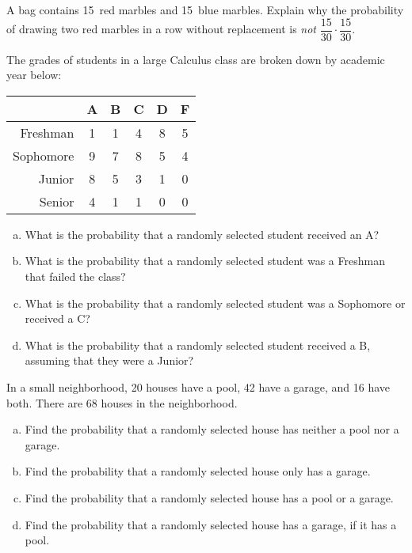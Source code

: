\documentclass[11pt,letterpaper]{article}
\begin{document}

 A bag contains 15~red marbles and 15~blue marbles. Explain why the probability of drawing two red marbles in a row without replacement is \textit{not} $\dfrac{15}{30} \cdot \dfrac{15}{30}$. 



\newpage



 The grades of students in a large Calculus class are broken down by academic year below: \par
	\begin{table}[h]
	\centering
	\begin{tabular}{r|ccccc}
		& A & B & C & D & F \\ \hline
	Freshman & 1 & 1 & 4 & 8 & 5 \\
	Sophomore & 9 & 7 & 8 & 5 & 4 \\
	Junior & 8 & 5 & 3 & 1 & 0 \\
	Senior & 4 & 1 & 1 & 0 & 0 
	\end{tabular}
	\end{table} \par

\begin{enumerate}[(a)]
\item What is the probability that a randomly selected student received an A? 
\item What is the probability that a randomly selected student was a Freshman that failed the class?
\item What is the probability that a randomly selected student was a Sophomore or received a C?
\item What is the probability that a randomly selected student received a B, assuming that they were a Junior? 
\end{enumerate}



\newpage



 In a small neighborhood, 20 houses have a pool, 42 have a garage, and 16 have both. There are 68 houses in the neighborhood. 
	\begin{enumerate}[(a)]
	\item Find the probability that a randomly selected house has neither a pool nor a garage. 
	\item Find the probability that a randomly selected house only has a garage. 
	\item Find the probability that a randomly selected house has a pool or a garage. 
	\item Find the probability that a randomly selected house has a garage, if it has a pool. 
	\end{enumerate}
\end{document}

